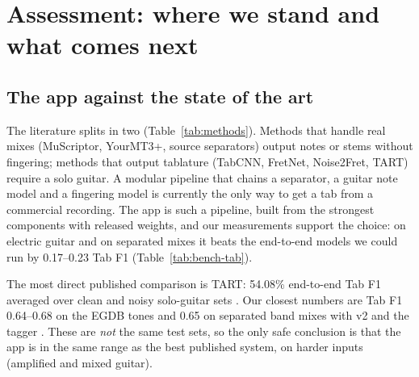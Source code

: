\section{Assessment: where we stand and what comes next}
\label{sec:assessment}

\subsection{The app against the state of the art}

The literature splits in two (Table~\ref{tab:methods}). Methods that handle real
mixes (MuScriptor, YourMT3+, source separators) output notes or stems without
fingering; methods that output tablature (TabCNN, FretNet, Noise2Fret, TART)
require a solo guitar. A modular pipeline that chains a separator, a guitar note
model and a fingering model is currently the only way to get a tab from a
commercial recording. The app is such a pipeline, built from the strongest
components with released weights, and our measurements support the choice: on
electric guitar and on separated mixes it beats the end-to-end models we could
run by 0.17--0.23 Tab F1 (Table~\ref{tab:bench-tab}).

The most direct published comparison is TART: 54.08\% end-to-end Tab F1 averaged
over clean and noisy solo-guitar sets \reported. Our closest numbers are Tab F1
0.64--0.68 on the EGDB tones and 0.65 on separated band mixes with v2 and the
tagger \measured. These are \emph{not} the same test sets, so the only safe
conclusion is that the app is in the same range as the best published system,
on harder inputs (amplified and mixed guitar).

